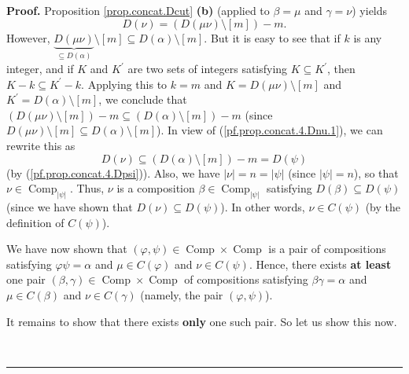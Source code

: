 \documentclass[numbers=enddot,12pt,final,onecolumn,notitlepage]{scrartcl}%
\theoremstyle{definition}
\newenvironment{proof}[1][Proof]{\noindent\textbf{#1.} }{\ \rule{0.5em}{0.5em}}
\begin{document}
\begin{proof}
Proposition \ref{prop.concat.Dcut} \textbf{(b)} (applied to $\beta=\mu$ and
$\gamma=\nu$) yields%
\begin{equation}
D\left(  \nu\right)  =\left(  D\left(  \mu\nu\right)  \setminus\left[
m\right]  \right)  -m. \label{pf.prop.concat.4.Dnu.1}%
\end{equation}
However, $\underbrace{D\left(  \mu\nu\right)  }_{\subseteq D\left(
\alpha\right)  }\setminus\left[  m\right]  \subseteq D\left(  \alpha\right)
\setminus\left[  m\right]  $. But it is easy to see that if $k$ is any
integer, and if $K$ and $K^{\prime}$ are two sets of integers satisfying
$K\subseteq K^{\prime}$, then $K-k\subseteq K^{\prime}-k$. Applying this to
$k=m$ and $K=D\left(  \mu\nu\right)  \setminus\left[  m\right]  $ and
$K^{\prime}=D\left(  \alpha\right)  \setminus\left[  m\right]  $, we conclude
that $\left(  D\left(  \mu\nu\right)  \setminus\left[  m\right]  \right)
-m\subseteq\left(  D\left(  \alpha\right)  \setminus\left[  m\right]  \right)
-m$ (since $D\left(  \mu\nu\right)  \setminus\left[  m\right]  \subseteq
D\left(  \alpha\right)  \setminus\left[  m\right]  $). In view of
(\ref{pf.prop.concat.4.Dnu.1}), we can rewrite this as%
\[
D\left(  \nu\right)  \subseteq \left(  D\left(  \alpha\right)  \setminus\left[
m\right]  \right)  -m=D\left(  \psi\right)
\]
(by (\ref{pf.prop.concat.4.Dpsi})). Also, we have $\left\vert \nu\right\vert
=n=\left\vert \psi\right\vert $ (since $\left\vert \psi\right\vert =n$), so
that $\nu\in\operatorname*{Comp}\nolimits_{\left\vert \psi\right\vert }$.
Thus, $\nu$ is a composition $\beta\in\operatorname*{Comp}%
\nolimits_{\left\vert \psi\right\vert }$ satisfying $D\left(  \beta\right)
\subseteq D\left(  \psi\right)  $ (since we have shown that $D\left(
\nu\right)  \subseteq D\left(  \psi\right)  $). In other words, $\nu\in
C\left(  \psi\right)  $ (by the definition of $C\left(  \psi\right)  $).

We have now shown that $\left(  \varphi,\psi\right)  \in\operatorname*{Comp}%
\times\operatorname*{Comp}$ is a pair of compositions satisfying $\varphi
\psi=\alpha$ and $\mu\in C\left(  \varphi\right)  $ and $\nu\in C\left(
\psi\right)  $. Hence, there exists \textbf{at least} one pair $\left(
\beta,\gamma\right)  \in\operatorname*{Comp}\times\operatorname*{Comp}$ of
compositions satisfying $\beta\gamma=\alpha$ and $\mu\in C\left(
\beta\right)  $ and $\nu\in C\left(  \gamma\right)  $ (namely, the pair
$\left(  \varphi,\psi\right)  $).

It remains to show that there exists \textbf{only} one such pair. So let us
show this now.


\end{proof}
\end{document}
